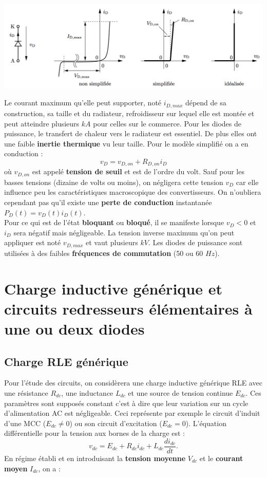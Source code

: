 		\begin{center}
		\includegraphics[scale=0.45]{ch2/2}
		\end{center}			
		
		Le courant maximum qu'elle peut supporter, noté $i_{D,max}$ dépend de sa construction, sa taille et du radiateur, refroidisseur sur lequel elle est montée et peut atteindre plusieurs $kA$ pour celles sur le commerce. Pour les diodes de puissance, le transfert de chaleur vers le radiateur est essentiel. De plus elles ont une faible \textbf{inertie thermique} vu leur taille. Pour le modèle simplifié on a en conduction :
		\begin{equation}
			v_D = v_{D,on} + R_{D,on} i_D
		\end{equation}
		où $v_{D,on}$ est appelé \textbf{tension de seuil} et est de l'ordre du volt. Sauf pour les basses tensions (dizaine de volts ou moins), on négligera cette tension $v_D$ car elle influence peu les caractéristiques macroscopique des convertisseurs. On n'oubliera cependant pas qu'il existe une \textbf{perte de conduction} instantanée $P_D(t) = v_D(t)i_D(t)$. \\
	
		Pour ce qui est de l'état \textbf{bloquant} ou \textbf{bloqué}, il se manifeste lorsque $v_D < 0$ et $i_D$ sera négatif mais négligeable. La tension inverse maximum qu'on peut appliquer est noté $v_{D,max}$ et vaut plusieurs $kV$. Les diodes de puissance sont utilisées à des faibles \textbf{fréquences de commutation} (50 ou 60 $Hz$).
	
	\section{Charge inductive générique et circuits redresseurs élémentaires à une ou deux diodes}
		\subsection{Charge RLE générique}
			Pour l'étude des circuits, on considèrera une charge inductive générique RLE avec une résistance $R_{dc}$, une inductance $L_{dc}$ et une source de tension continue $E_{dc}$. Ces paramètres sont supposés constant c'est à dire que leur variation sur un cycle d'alimentation AC est négligeable. Ceci représente par exemple le circuit d'induit d'une MCC ($E_{dc}\neq 0$) ou son circuit d'excitation ($E_{dc}=0$). L'équation différentielle pour la tension aux bornes de la charge est :
			\begin{equation}
				v_{dc} = E_{dc} + R_{dc}i_{dc} + L_{dc}\frac{di_{dc}}{dt}.
			\end{equation}
			En régime établi et en introduisant la \textbf{tension moyenne} $V_{dc}$ et le \textbf{courant moyen} $I_{dc}$, on a :
			
